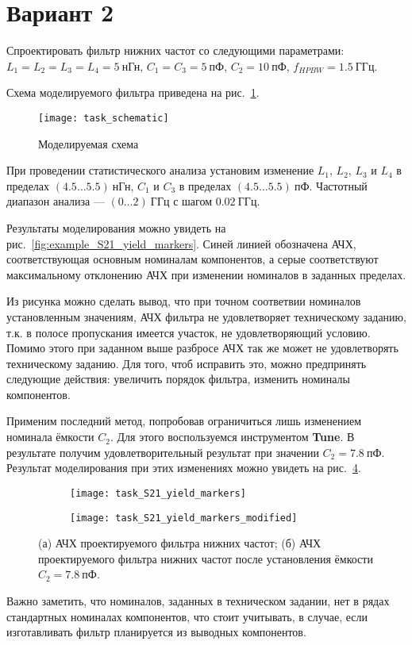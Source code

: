 \section{Вариант 2}

Спроектировать фильтр нижних частот со следующими параметрами: $L_1 = L_2 = L_3 = L_4 = 5~\text{нГн}$, $C_1 = C_3 = 5~\text{пФ}$, $C_2 = 10~\text{пФ}$, $f_{HPBW} = 1.5~\text{ГГц}$.

Схема моделируемого фильтра приведена на рис.~\ref{fig:task_schematic}.

\begin{figure}[!ht]
    \centering
    \texttt{[image: task\_schematic]}
    \caption{Моделируемая схема}%
    \label{fig:task_schematic}
\end{figure}

При проведении статистического анализа установим изменение $L_1$, $L_2$, $L_3$ и $L_4$ в пределах $(4.5 \dots 5.5)~\text{нГн}$, $C_1$ и $C_3$ в пределах $(4.5 \dots 5.5)~\text{пФ}$.
Частотный диапазон анализа --- $(0 \dots 2)~\text{ГГц}$ с шагом $0.02~\text{ГГц}$.

Результаты моделирования можно увидеть на рис.~\ref{fig:example_S21_yield_markers}.
Синей линией обозначена АЧХ, соответствующая основным номиналам компонентов, а серые соответствуют максимальному отклонению АЧХ при изменении номиналов в заданных пределах.

Из рисунка можно сделать вывод, что при точном соответвии номиналов установленным значениям, АЧХ фильтра не удовлетворяет техническому заданию, т.к. в полосе пропускания имеется участок, не удовлетворяющий условию.
Помимо этого при заданном выше разбросе АЧХ так же может не удовлетворять техническому заданию.
Для того, чтоб исправить это, можно предпринять следующие действия: увеличить порядок фильтра, изменить номиналы компонентов.

Применим последний метод, попробовав ограничиться лишь изменением номинала ёмкости $C_2$.
Для этого воспользуемся инструментом \textbf{Tune}.
В результате получим удовлетворительный результат при значении $C_2 = 7.8~\text{пФ}$.
Результат моделирования при этих изменениях можно увидеть на рис.~\ref{fig:task_S21_yield_markers_modified}.

\begin{figure}[!ht]
    \centering
    \begin{subfigure}{0.45\textwidth}
        \centering
        \texttt{[image: task\_S21\_yield\_markers]}
        \caption{}%
        \label{fig:task_S21_yield_markers}
    \end{subfigure}
    \hfill
    \begin{subfigure}{0.45\textwidth}
        \centering
        \texttt{[image: task\_S21\_yield\_markers\_modified]}
        \caption{}%
        \label{fig:task_S21_yield_markers_modified}
    \end{subfigure}
    \caption{%
        (а) АЧХ проектируемого фильтра нижних частот;
        (б) АЧХ проектируемого фильтра нижних частот после установления ёмкости $C_2 = 7.8~\text{пФ}$.
    }
\end{figure}

Важно заметить, что номиналов, заданных в техническом задании, нет в рядах стандартных номиналах компонентов, что стоит учитывать, в случае, если изготавливать фильтр планируется из выводных компонентов.
